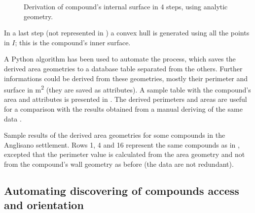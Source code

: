 \begin{figure}[H]

                \caption[Derivation of compound's internal surface using analytic geometry]{Derivation of compound's internal surface in 4 steps, using analytic geometry.}
                \label{fig:comp-iter}
            \end{figure}
            
            In a last step (not represented in ) a convex hull is generated using all the points in $I$; this is the compound's inner surface.

            A Python algorithm has been used to automate the process, which saves the derived area geometries to a database table separated from the others. Further informations could be derived from these geometries, mostly their perimeter and surface in \si{\meter\squared} (they are saved as attributes). A sample table with the compound's area and attributes is presented in . The derived perimeters and areas are useful for a comparison with the results obtained from a manual deriving of the same data \cite{laterza}.

            \begin{table}[!htb]
                \centering
                
                \caption[Sample results of area geometries derived from compounds and their attributes for the Anglisano settlement.]{Sample results of the derived area geometries for some compounds in the Anglisano settlement. Rows 1, 4 and 16 represent the same compounds as in , excepted that the perimeter value is calculated from the area geometry and not from the compound's wall geometry as before (the data are not redundant).}
                \label{tab:tab-area-anglisano}
            \end{table}

        \subsection{Automating discovering of compounds access and orientation\label{sec:orientation}}

